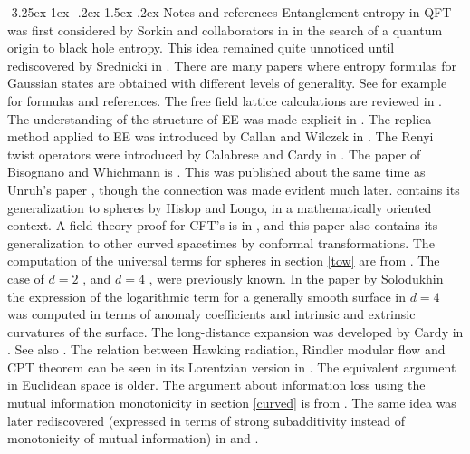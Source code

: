 \documentclass[11pt]{article}
\makeatletter
\renewcommand\subsection{\@startsection{subsection}{2}{\z@}%
                                   {-3.25ex\@plus -1ex \@minus -.2ex}%
                                     {1.5ex \@plus .2ex}%
                                     {\normalfont\bfseries}}
\numberwithin{equation}{section}
\makeatother
\begin{document}
\subsection{Notes and references}
Entanglement entropy in QFT was first considered by Sorkin and collaborators in \cite{Sorkin:2014kta,Bombelli:1986rw} in the search of a quantum origin to black hole entropy. This idea remained quite unnoticed until rediscovered by Srednicki in \cite{Srednicki:1993im}. 
There are many papers where entropy formulas for Gaussian states are obtained with different levels of generality. See for example  \cite{peschel2009reduced} for formulas and references. 
The free field lattice calculations are reviewed in \cite{Casini:2009sr}. The understanding of the structure of EE was made explicit in  \cite{Liu:2012eea,Grover:2011fa}. The replica method applied to EE was introduced by Callan and Wilczek in \cite{Callan:1994py}. The Renyi twist operators were introduced by Calabrese and Cardy in \cite{Calabrese:2004eu}. The paper of Bisognano and Whichmann 
 is \cite{Bisognano:1975ih}. This was published about the same time as Unruh's paper  \cite{unruh1976notes}, though the connection was made evident much later.  
 \cite{Hislop:1981uh} contains its generalization to spheres by Hislop and Longo, in a mathematically oriented context. A field theory proof for CFT's is in \cite{Casini:2011kv}, and this paper also contains its generalization to other curved spacetimes by conformal transformations. The computation of the universal terms for spheres in section \ref{tow} are from \cite{Casini:2011kv}. The case of $d=2$ \cite{Holzhey:1994we}, and $d=4$ \cite{Solodukhin:2008dh}, were previously known. In the paper by Solodukhin \cite{Solodukhin:2008dh} the expression of the logarithmic term for a generally smooth surface in $d=4$ was computed in terms of anomaly coefficients and intrinsic and extrinsic curvatures of the surface. The long-distance expansion was developed by Cardy in \cite{Cardy.esferaslejanas}. See also \cite{Agon:2015ftl}. The relation between Hawking radiation, Rindler modular flow and CPT theorem can be seen in its Lorentzian version in \cite{sewell1982quantum}. The equivalent argument in Euclidean space is older. The argument about information loss using the mutual information monotonicity in section \ref{curved} is from \cite{Casini:2007dk}.        The same idea was later rediscovered (expressed in terms of strong subadditivity instead of monotonicity of mutual information) in \cite{Mathur:2009hf} and \cite{Almheiri:2012rt}. 
\end{document}
